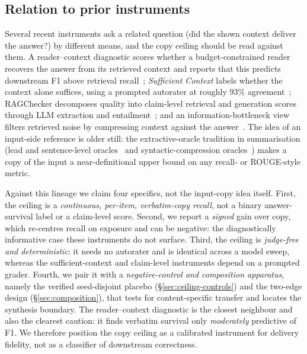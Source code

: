 \subsection{Relation to prior instruments}\label{sec:ceiling-prior}
Several recent instruments ask a related question (did the shown context deliver the answer?) by different means, and the copy ceiling should be read against them. A reader--context diagnostic scores whether a budget-constrained reader recovers the answer from its retrieved context and reports that this predicts downstream F1 above retrieval recall~\cite{readercontext2026}; \emph{Sufficient Context} labels whether the context alone suffices, using a prompted autorater at roughly $93\%$ agreement~\cite{sufficientcontext2025}; RAGChecker decomposes quality into claim-level retrieval and generation scores through LLM extraction and entailment~\cite{ragchecker2024}; and an information-bottleneck view filters retrieved noise by compressing context against the answer~\cite{zhu2024ibrag}. The idea of an input-side reference is older still: the extractive-oracle tradition in summarisation (lead and sentence-level oracles~\cite{see2017pointergenerator,narayan2018xsum} and syntactic-compression oracles~\cite{xu2019extractive}) makes a copy of the input a near-definitional upper bound on any recall- or ROUGE-style metric.

Against this lineage we claim four specifics, not the input-copy idea itself. First, the ceiling is a \emph{continuous, per-item, verbatim-copy recall}, not a binary answer-survival label or a claim-level score. Second, we report a \emph{signed} gain over copy, which re-centres recall on exposure and can be negative: the diagnostically informative case these instruments do not surface. Third, the ceiling is \emph{judge-free and deterministic}: it needs no autorater and is identical across a model sweep, whereas the sufficient-context and claim-level instruments depend on a prompted grader. Fourth, we pair it with a \emph{negative-control and composition apparatus}, namely the verified seed-disjoint placebo (\S\ref{sec:ceiling-controls}) and the two-edge design (\S\ref{sec:composition}), that tests for content-specific transfer and locates the synthesis boundary. The reader--context diagnostic is the closest neighbour and also the clearest caution: it finds verbatim survival only \emph{moderately} predictive of F1. We therefore position the copy ceiling as a calibrated instrument for delivery fidelity, not as a classifier of downstream correctness.



